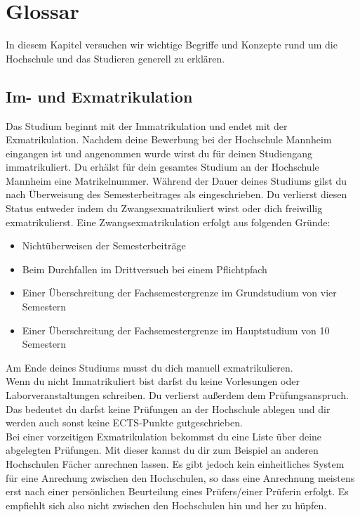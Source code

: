 \section*{Glossar}
In diesem Kapitel versuchen wir wichtige Begriffe und Konzepte rund um die Hochschule und das Studieren generell zu erklären.

\subsection*{Im- und Exmatrikulation}\label{glos:exma}
Das Studium beginnt mit der Immatrikulation und endet mit der Exmatrikulation.
Nachdem deine Bewerbung bei der Hochschule Mannheim eingangen ist und angenommen wurde wirst du für deinen Studiengang immatrikuliert.
Du erhälst für dein gesamtes Studium an der Hochschule Mannheim eine Matrikelnummer.
Während der Dauer deines Studiums gilst du nach Überweisung des Semesterbeitrages als eingeschrieben.
Du verlierst diesen Status entweder indem du Zwangsexmatrikuliert wirst oder dich freiwillig exmatrikulierst.
Eine Zwangsexmatrikulation erfolgt aus folgenden Gründe:
\begin{itemize}
    \item Nichtüberweisen der Semesterbeiträge
    \item Beim Durchfallen im Drittversuch bei einem Pflichtpfach
    \item Einer Überschreitung der Fachsemestergrenze im Grundstudium von vier Semestern
    \item Einer Überschreitung der Fachsemestergrenze im Hauptstudium von 10 Semestern
\end{itemize}
Am Ende deines Studiums musst du dich manuell exmatrikulieren.
\\
Wenn du nicht Immatrikuliert bist darfst du keine Vorlesungen oder Laborveranstaltungen schreiben.
Du verlierst außerdem dem Prüfungsanspruch.
Das bedeutet du darfst keine Prüfungen an der Hochschule ablegen und dir werden auch sonst keine ECTS-Punkte gutgeschrieben.
\\
Bei einer vorzeitigen Exmatrikulation bekommst du eine Liste über deine abgelegten Prüfungen.
Mit dieser kannst du dir zum Beispiel an anderen Hochschulen Fächer anrechnen lassen.
Es gibt jedoch kein einheitliches System für eine Anrechung zwischen den Hochschulen, so dass eine Anrechnung meistens erst nach einer persönlichen Beurteilung eines Prüfers/einer Prüferin erfolgt.
Es empfiehlt sich also nicht zwischen den Hochschulen hin und her zu hüpfen.

